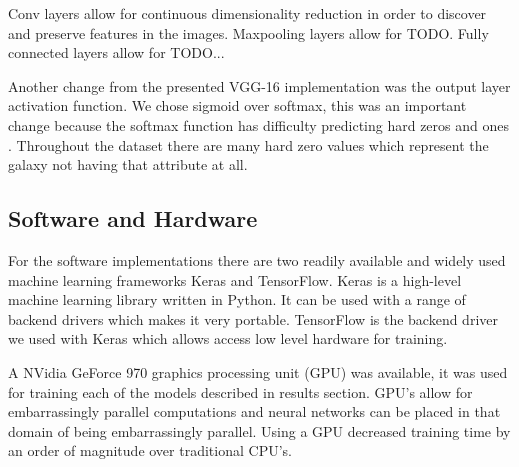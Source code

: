 Conv layers allow for continuous dimensionality reduction in order to discover and preserve features in the images. Maxpooling layers allow for TODO. Fully connected layers allow for TODO...

Another change from the presented VGG-16 implementation was the output layer activation function. We chose sigmoid over softmax, this was an important change because the softmax function has difficulty predicting hard zeros and ones \cite{kaggle-winner}. Throughout the dataset there are many hard zero values which represent the galaxy not having that attribute at all.

\subsection{Software and Hardware}\label{hard-soft-ware}
For the software implementations there are two readily available and widely used machine learning frameworks Keras and TensorFlow. Keras is a high-level machine learning library written in Python. It can be used with a range of backend drivers which makes it very portable. TensorFlow is the backend driver we used with Keras which allows access low level hardware for training.

A NVidia GeForce 970 graphics processing unit (GPU) was available, it was used for training each of the models described in results section. GPU's allow for embarrassingly parallel computations and neural networks can be placed in that domain of being embarrassingly parallel. Using a GPU decreased training time by an order of magnitude over traditional CPU's.
